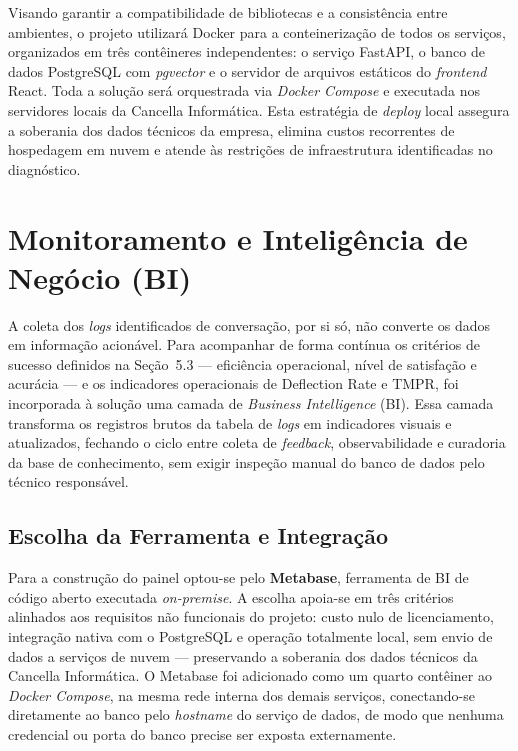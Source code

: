 \documentclass[a4paper,12pt,Times]{article}
\begin{document}
Visando garantir a compatibilidade de bibliotecas e a consistência entre ambientes, o
projeto utilizará Docker para a conteinerização de todos os serviços, organizados em três
contêineres independentes: o serviço FastAPI, o banco de dados PostgreSQL com
\textit{pgvector} e o servidor de arquivos estáticos do \textit{frontend} React. Toda a
solução será orquestrada via \textit{Docker Compose} e executada nos servidores locais da
Cancella Informática. Esta estratégia de \textit{deploy} local assegura a soberania dos
dados técnicos da empresa, elimina custos recorrentes de hospedagem em nuvem e atende às
restrições de infraestrutura identificadas no diagnóstico.


\section{Monitoramento e Inteligência de Negócio (BI)}

A coleta dos \textit{logs} identificados de conversação, por si só, não converte os dados
em informação acionável. Para acompanhar de forma contínua os critérios de sucesso definidos
na Seção~5.3 — eficiência operacional, nível de satisfação e acurácia — e os indicadores
operacionais de Deflection Rate e TMPR, foi incorporada à solução uma camada de
\textit{Business Intelligence} (BI). Essa camada transforma os registros brutos da tabela
de \textit{logs} em indicadores visuais e atualizados, fechando o ciclo entre coleta de
\textit{feedback}, observabilidade e curadoria da base de conhecimento, sem exigir inspeção
manual do banco de dados pelo técnico responsável.

\subsection{Escolha da Ferramenta e Integração}

Para a construção do painel optou-se pelo \textbf{Metabase}, ferramenta de BI de código
aberto executada \textit{on-premise}. A escolha apoia-se em três critérios alinhados aos
requisitos não funcionais do projeto: custo nulo de licenciamento, integração nativa com o
PostgreSQL e operação totalmente local, sem envio de dados a serviços de nuvem — preservando
a soberania dos dados técnicos da Cancella Informática. O Metabase foi adicionado como um
quarto contêiner ao \textit{Docker Compose}, na mesma rede interna dos demais serviços,
conectando-se diretamente ao banco pelo \textit{hostname} do serviço de dados, de modo que
nenhuma credencial ou porta do banco precise ser exposta externamente.
\end{document}
